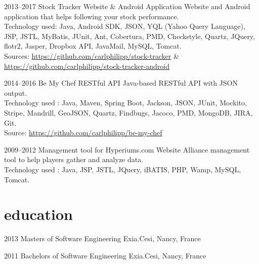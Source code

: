 \documentclass[]{friggeri-cv} %
\begin{document}
\begin{entrylist}

\entry
{2013--2017}
{}
{Stock Tracker}
{  Website \& Android Application}
{}
{Website and Android application that helps following your stock performance.\\
Technology used: Java, Android SDK, JSON, YQL (Yahoo Query Language), JSP, JSTL, MyBatis,
JUnit, Ant, Cobertura, PMD, Checkstyle, Quartz, JQuery, flotr2, Jasper, Dropbox API, JavaMail,
MySQL, Tomcat.\\
\footnotesize{Sources: \href{https://github.com/carlphilipp/stock-tracker}{https://github.com/carlphilipp/stock-tracker} \& \href{https://github.com/carlphilipp/stock-tracker}{https://github.com/carlphilipp/stock-tracker-android}}}

\end{entrylist}

\begin{entrylist}

\entry
{2014--2016}
{}
{Be My Chef}
{  RESTful API}
{}
{Java-based RESTful API with JSON output.\\
Technology used : Java, Maven, Spring Boot, Jackson, JSON, JUnit, Mockito, Stripe, Mandrill, GeoJSON, Quartz, Findbugs, Jacoco, PMD, MongoDB, JIRA, Git.\\
\footnotesize{Source: \href{https://github.com/carlphilipp/be-my-chef}{https://github.com/carlphilipp/be-my-chef}}
}

\end{entrylist}


\begin{entrylist}

\entry
{2009--2012}
{}
{Management tool for Hyperiums.com}
{Website}
{}
{Alliance management tool to help players gather and analyze data.\\
Technology used : Java, JSP, JSTL, JQuery, iBATIS, PHP, Wamp, MySQL, Tomcat.}

\end{entrylist}


\section{education}

\begin{entrylist}


\entry
{2013}
{}
{Masters {\normalfont of Software Engineering}}
{}
{Exia.Cesi, Nancy, France}
{}


\entry
{2011}
{}
{Bachelors {\normalfont of Software Engineering}}
{}
{Exia.Cesi, Nancy, France}
{}


\end{entrylist}
\end{document}
